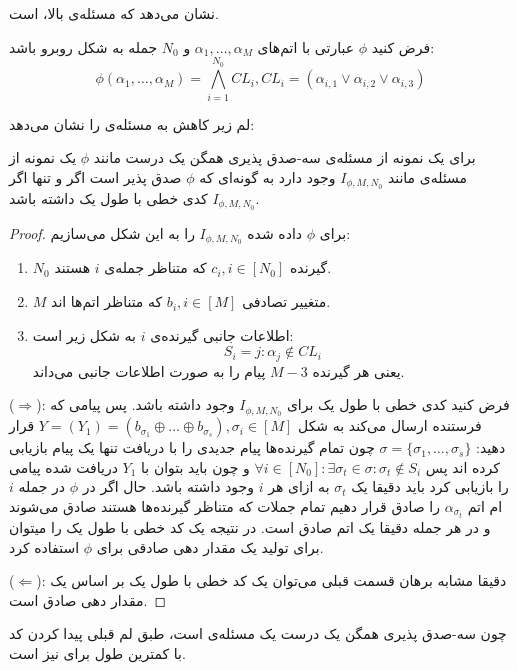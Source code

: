 \cite{10.1145/800133.804350}
نشان می‌دهد که مسئله‌ی بالا، 
\nphard
است.

فرض کنید
$\phi$
عبارتی با اتم‌های
$\alpha_1, \ldots, \alpha_M$
و
$N_0$
جمله به شکل روبرو باشد:
$$\phi(\alpha_1, \ldots, \alpha_M) = \bigwedge\limits_{i = 1}^{N_0} CL_i, CL_i = (\alpha_{i, 1} \vee \alpha_{i, 2} \vee \alpha_{i, 3})$$

لم زیر کاهش به مسئله‌ی
\picod
را نشان می‌دهد:
\begin{lemma}
	برای یک نمونه از مسئله‌ی سه-صدق پذیری همگن یک درست مانند
	$\phi$
	یک نمونه از مسئله‌ی
	\picod
	مانند
	$I_{\phi, M, N_0}$
	وجود دارد به گونه‌ای که 
	$\phi$
	صدق پذیر است اگر و تنها اگر 
	$I_{\phi, M, N_0}$
	کدی خطی با طول یک داشته باشد.
\end{lemma}
\begin{proof}
	برای
	$\phi$
	داده شده
		$I_{\phi, M, N_0}$
		را به این شکل می‌سازیم:
		\begin{enumerate}
			\item
			$N_0$
			گیرنده
			$c_i, i \in [N_0]$
			که متناظر جمله‌ی
			$i$
			هستند.
			\item
			$M$
			متغییر تصادفی
			$b_i, i \in [M]$
			 که متناظر اتم‌ها اند.
			 \item 
			 اطلاعات جانبی گیرنده‌ی
			 $i$
			 به شکل زیر است:
			 $$S_i = {j: \alpha_j \notin CL_i}$$
			 یعنی هر گیرنده
			 $M - 3$
			 پیام را به صورت اطلاعات جانبی می‌داند.
		\end{enumerate}
		($\Rightarrow$):
		فرض کنید کدی خطی با طول یک برای
			$I_{\phi, M, N_0}$
			وجود داشته باشد. پس پیامی که فرستنده ارسال می‌کند به شکل
			$Y = (Y_1) = (b_{\sigma_1} \oplus \ldots \oplus b_{\sigma_s}), \sigma_i \in [M]$
			قرار دهید: 
			$\sigma = \{ \sigma_1, \ldots, \sigma_s \}$
			چون تمام گیرنده‌ها پیام جدیدی را با دریافت تنها یک پیام بازیابی کرده اند پس
			$\forall i \in [N_0]: \exists \sigma_t \in \sigma: \sigma_t \notin S_i$
			و چون باید بتوان با 
			$Y_1$
			دریافت شده پیامی را بازیابی کرد باید دقیقا یک
			$\sigma_t$
			به ازای هر
			$i$
			وجود داشته باشد. حال اگر در
			$\phi$
			در جمله
			$i$
			ام اتم
			$\alpha_{\sigma_t}$
			را صادق قرار دهیم تمام جملات که متناظر گیرنده‌ها هستند صادق می‌شوند و در هر جمله دقیقا یک اتم صادق است. در نتیجه یک کد خطی با طول یک را میتوان برای تولید یک مقدار دهی صادقی برای
			$\phi$
			استفاده کرد.
			
			($\Leftarrow$):
			دقیقا مشابه برهان قسمت قبلی می‌توان یک کد خطی با طول یک بر اساس یک مقدار دهی صادق است.
\end{proof}
چون سه-صدق پذیری همگن یک درست یک مسئله‌ی
\nphard
است، طبق لم قبلی پیدا کردن کد با کمترین طول برای
\lpicod
نیز
\nphard
است.

